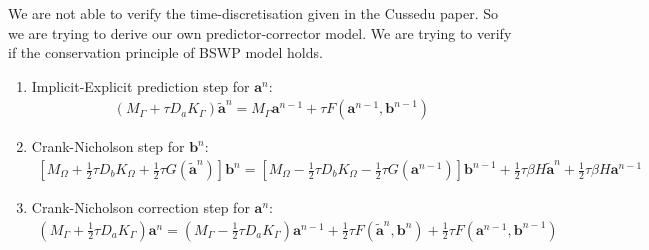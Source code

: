 \documentclass{article}
\begin{document}
We are not able to verify the time-discretisation given in the Cussedu paper.
So we are trying to derive our own predictor-corrector model. We are trying to
verify if the conservation principle of BSWP model holds.

\begin{enumerate}
	\item Implicit-Explicit prediction step for $\mathbf{a}^{n}$:
		\begin{align}
			\left(M_{\Gamma} + \tau D_a K_{\Gamma}\right)\tilde{\mathbf{a}}^n =
			M_{\Gamma}\mathbf{a}^{n-1} + \tau F\left(\mathbf{a}^{n-1},\mathbf{b}^{n-1}\right)
		\end{align}
	\item Crank-Nicholson step for $\mathbf{b}^n$:
		\begin{align}
			\left[M_{\Omega} + \frac{1}{2}\tau D_b K_{\Omega} + \frac{1}{2}\tau
			G(\tilde{\mathbf{a}}^{n}) \right]\mathbf{b}^n = \left[M_{\Omega} -
			\frac{1}{2}\tau D_b K_{\Omega} - \frac{1}{2}\tau
			G(\mathbf{a}^{n-1})\right]\mathbf{b}^{n-1} + \frac{1}{2}\tau\beta H
			\tilde{\mathbf{a}}^n + \frac{1}{2}\tau\beta H \mathbf{a}^{n-1}
		\end{align}
	\item Crank-Nicholson correction step for $\mathbf{a}^{n}$:
		\begin{align}
			\left(M_{\Gamma} + \frac{1}{2}\tau D_aK_{\Gamma}\right)\mathbf{a}^n =
			\left(M_{\Gamma} - \frac{1}{2}\tau D_a K_{\Gamma}\right)\mathbf{a}^{n-1} +
			\frac{1}{2}\tau F(\tilde{\mathbf{a}}^n,\mathbf{b}^n) + \frac{1}{2}\tau
			F(\mathbf{a}^{n-1},\mathbf{b}^{n-1})
		\end{align}
\end{enumerate}
\end{document}
